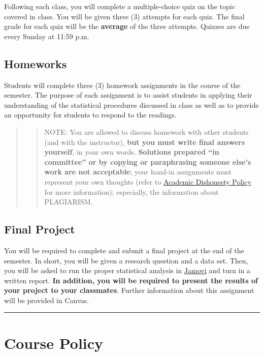 \documentclass[11pt,]{article}
\begin{document}
Following each class, you will complete a multiple-choice quiz on the
topic covered in class. You will be given three (3) attempts for each
quiz. The final grade for each quiz will be the \textbf{average} of the
three attempts. Quizzes are due every Sunday at 11:59 p.m.

\hypertarget{homeworks}{%
\subsection{Homeworks}\label{homeworks}}

Students will complete three (3) homework assignments in the course of
the semester. The purpose of each assignment is to assist students in
applying their understanding of the statistical procedures discussed in
class as well as to provide an opportunity for students to respond to
the readings.

\begin{quote}
\begin{quote}
NOTE: You are allowed to discuss homework with other students (and with
the instructor), \textbf{but you must write final answers yourself}, in
your own words. \textbf{Solutions prepared ``in committee'' or by
copying or paraphrasing someone else's work are not acceptable}; your
hand-in assignments must represent your own thoughts (refer to
\protect\hyperlink{dishonesty}{Academic Dishonesty Policy} for more
information); especially, the information about PLAGIARISM.
\end{quote}
\end{quote}

\hypertarget{final-project}{%
\subsection{Final Project}\label{final-project}}

You will be required to complete and submit a final project at the end
of the semester. In short, you will be given a research question and a
data set. Then, you will be asked to run the proper statistical analysis
in \protect\hyperlink{supplies}{Jamovi} and turn in a written report.
\textbf{In addition, you will be required to present the results of your
project to your classmates}. Further information about this assignment
will be provided in Canvas.

\begin{center}\rule{0.5\linewidth}{0.5pt}\end{center}

\hypertarget{course-policy}{%
\section{Course Policy}\label{course-policy}}
\end{document}
